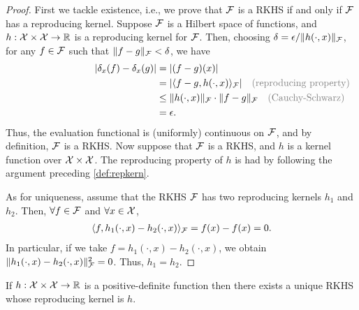 \begin{proof}
  First we tackle existence, i.e., we prove that ${\mathcal F}$ is a RKHS if and only if ${\mathcal F}$ has a reproducing kernel.
  Suppose ${\mathcal F}$ is a Hilbert space of functions, and $h:{\mathcal X}\times{\mathcal X}\to\mathbb{R}$ is a reproducing kernel for ${\mathcal F}$.
  Then, choosing $\delta=\epsilon / \lVert h(\cdot,x)\rVert_{\mathcal F}$, for any $f \in {\mathcal F}$ such that $\lVert f-g\rVert_{\mathcal F} < \delta$, we have
  \begin{align*}
    \vert \delta_x (f) - \delta_x (g) \vert 
    &= \vert (f-g)(x) \vert \\
    &= |\ip{f-g,h(\cdot,x)}_\cF| \mycomment{(reproducing property)} \\
    &\leq \norm{h(\cdot,x)}_\cF \cdot \norm{f-g}_\cF \mycomment{(Cauchy-Schwarz)} \\
    &= \epsilon.
  \end{align*}
  Thus, the evaluation functional is (uniformly) continuous on ${\mathcal F}$, and by definition, ${\mathcal F}$ is a RKHS.
  Now suppose that ${\mathcal F}$ is a RKHS, and $h$ is a kernel function over ${\mathcal X}\times{\mathcal X}$.
  The reproducing property of $h$ is had by following the argument preceding \cref{def:repkern}.
 
  As for uniqueness, assume that the RKHS ${\mathcal F}$ has two reproducing kernels $h_1$ and $h_2$. 
  Then, $\forall f\in{\mathcal F}$ and $\forall x\in{\mathcal X}$,
  \begin{align*}
    \langle f,h_1(\cdot,x) - h_2(\cdot,x)\rangle_{\mathcal F} = f(x) - f(x) = 0.
  \end{align*}
  In particular, if we take $f = h_1(\cdot,x) - h_2(\cdot,x)$, we obtain $\lVert h_1(\cdot,x) - h_2(\cdot,x)\rVert^2_{\mathcal F} = 0$.
  Thus, $h_1=h_2$.
\end{proof}

\begin{theorem}\label{thm:moorea}
  If $h:{\mathcal X}\times{\mathcal X}\to\mathbb{R}$ is a positive-definite function then there exists a unique RKHS whose reproducing kernel is $h$.
\end{theorem}

